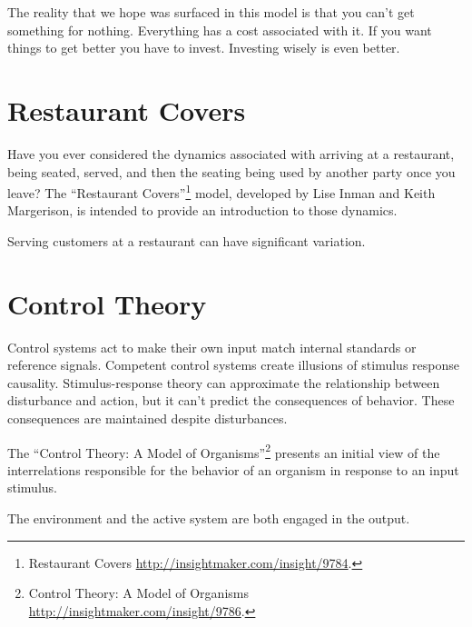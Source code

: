 \documentclass[]{memoir}
\begin{document}
The reality that we hope was surfaced in this model is that you can't
get something for nothing. Everything has a cost associated with it. If
you want things to get better you have to invest. Investing wisely is
even better.

\section{Restaurant Covers}

Have you ever considered the dynamics associated with arriving at a
restaurant, being seated, served, and then the seating being used by
another party once you leave? The ``Restaurant Covers''\footnote{Restaurant
  Covers \url{http://insightmaker.com/insight/9784}.} model, developed
by Lise Inman and Keith Margerison, is intended to provide an
introduction to those dynamics.

\FloatBarrier 

\begin{model}[frametitle={Model: Restaurant Covers}] 

 Serving customers at a restaurant can have significant variation.




 \end{model}

\section{Control Theory}

Control systems act to make their own input match internal standards or
reference signals. Competent control systems create illusions of
stimulus response causality. Stimulus-response theory can approximate
the relationship between disturbance and action, but it can't predict
the consequences of behavior. These consequences are maintained despite
disturbances.

The ``Control Theory: A Model of Organisms''\footnote{Control Theory: A
  Model of Organisms \url{http://insightmaker.com/insight/9786}.}
presents an initial view of the interrelations responsible for the
behavior of an organism in response to an input stimulus.

\FloatBarrier 

\begin{model}[frametitle={Model: Control Theory: A Model of Organisms}] 

 The environment and the active system are both engaged in the output.




 \end{model}
\end{document}
